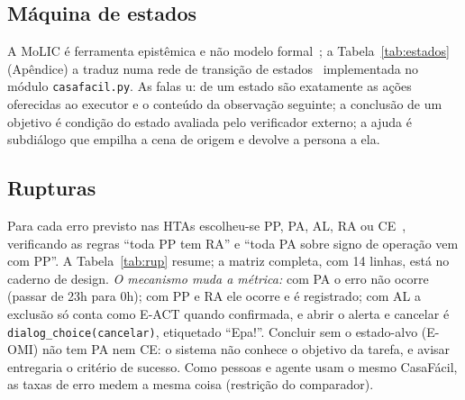 \documentclass[conference]{IEEEtran}
\newcommand{\ev}[1]{\texttt{#1}}
\begin{document}
\begin{table}[!t]
\caption{Leituras de cada elemento da MoLIC ($^*$ só sintético)}
\label{tab:leituras}
\centering

\end{table}

\subsection{Máquina de estados}
A MoLIC é ferramenta epistêmica e não modelo formal~\cite{barbosa2010}; a Tabela~\ref{tab:estados} (Apêndice) a traduz numa rede de transição de estados~\cite[cap.~16]{dix2004} implementada no módulo \texttt{casafacil.py}. As falas u: de um estado são exatamente as ações oferecidas ao executor e o conteúdo da observação seguinte; a conclusão de um objetivo é condição do estado avaliada pelo verificador externo; a ajuda é subdiálogo que empilha a cena de origem e devolve a persona a ela.

\subsection{Rupturas}
Para cada erro previsto nas HTAs escolheu-se PP, PA, AL, RA ou CE~\cite{barbosa2010}, verificando as regras ``toda PP tem RA'' e ``toda PA sobre signo de operação vem com PP''. A Tabela~\ref{tab:rup} resume; a matriz completa, com 14 linhas, está no caderno de design. \textit{O mecanismo muda a métrica:} com PA o erro não ocorre (passar de 23h para 0h); com PP e RA ele ocorre e é registrado; com AL a exclusão só conta como E-ACT quando confirmada, e abrir o alerta e cancelar é \ev{dialog\_choice(cancelar)}, etiquetado ``Epa!''. Concluir sem o estado-alvo (E-OMI) não tem PA nem CE: o sistema não conhece o objetivo da tarefa, e avisar entregaria o critério de sucesso. Como pessoas e agente usam o mesmo CasaFácil, as taxas de erro medem a mesma coisa (restrição do comparador).
\end{document}
